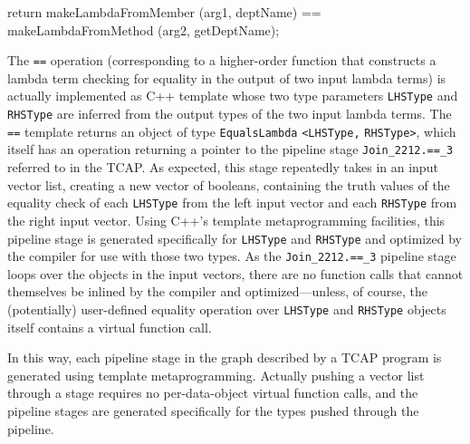 \begin{codesmall} 
	return makeLambdaFromMember (arg1, deptName) == 
	       makeLambdaFromMethod (arg2, getDeptName); 
\end{codesmall}

\noindent The \texttt{==} 
operation (corresponding to a higher-order function that
constructs a lambda term checking for equality in the output of two input lambda terms) is actually implemented as C++ template
whose two type parameters \texttt{LHSType} and \texttt{RHSType} are inferred from
the output types of the two input lambda terms. 
The \texttt{==} template returns an object of type \texttt{EqualsLambda} \texttt{<LHSType,} \texttt{RHSType>}, which
itself has an operation returning a pointer to the pipeline stage \texttt{Join\_2212.==\_3} referred to in the TCAP.
As expected, this stage repeatedly takes in an input vector list,
creating a new vector of booleans, containing the truth values of the equality check of each \texttt{LHSType} from the left
input vector and each \texttt{RHSType} from the right input vector.
Using C++'s template metaprogramming facilities, this 
pipeline stage is generated specifically for \texttt{LHSType} and \texttt{RHSType} and optimized by the compiler for use with those
two types.  
As the \texttt{Join\_2212.==\_3} pipeline stage loops over the objects in the input vectors, 
there are no function calls that cannot themselves be inlined by the compiler
and optimized---unless, of course, the (potentially) user-defined equality operation over \texttt{LHSType} and \texttt{RHSType}
objects itself contains a virtual function call.

In this way, each pipeline stage in the graph described by a TCAP program is generated using template metaprogramming.
Actually pushing a vector list through a stage requires no per-data-object virtual function calls, and the pipeline stages
are generated specifically for the types pushed through the pipeline.

